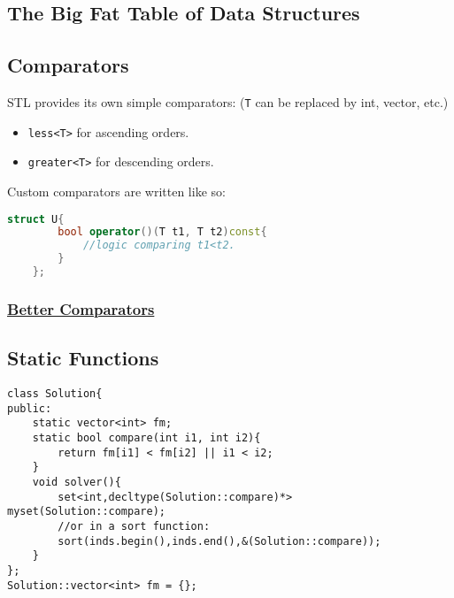 \documentclass{article}
\begin{document}
\subsection{The Big Fat Table of Data Structures}

\subsection{Comparators}
STL provides its own simple comparators: (\texttt{T} can be replaced by
int, vector, etc.)
\begin{itemize}
    \item \texttt{less<T>} for ascending orders.
    \item \texttt{greater<T>} for descending orders.
\end{itemize} Custom comparators are written like so:
\begin{lstlisting}[caption={Comparators},language=C++]
    struct U{
        bool operator()(T t1, T t2)const{
            //logic comparing t1<t2.
        }
    };
\end{lstlisting}
\subsubsection{\href{https://stackoverflow.com/a/46128321/14681493}{Better Comparators}}
\subsection*{Static Functions}
\begin{lstlisting}
class Solution{
public:
    static vector<int> fm;
    static bool compare(int i1, int i2){
        return fm[i1] < fm[i2] || i1 < i2;
    }
    void solver(){
        set<int,decltype(Solution::compare)*> myset(Solution::compare);
        //or in a sort function:
        sort(inds.begin(),inds.end(),&(Solution::compare));
    }
};
Solution::vector<int> fm = {};
\end{lstlisting}
\end{document}
